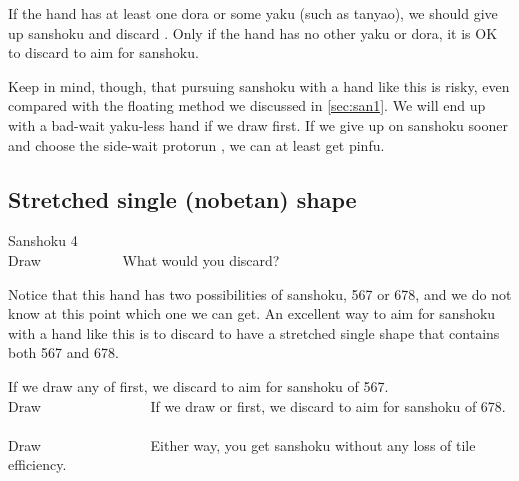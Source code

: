 \bigskip
If the hand has at least one {\jap dora} or some {\jap yaku} (such as {\jap tanyao}), we should give up {\jap sanshoku} and discard {\LARGE{}}. Only if the hand has no other {\jap yaku} or {\jap dora}, it is OK to discard {\LARGE{}} to aim for {\jap sanshoku}.

\bigskip
Keep in mind, though, that pursuing {\jap sanshoku} with a hand like this is risky, even compared with the floating method we discussed in \ref{sec:san1}. We will end up with a bad-wait {\jap yaku}-less hand if we draw {\LARGE{}} first. If we give up on {\jap sanshoku} sooner and choose the side-wait protorun {\LARGE{}}, we can at least get {\jap pinfu}.

\newpage
\subsection{Stretched single ({\jap nobetan}) shape}\label{sec:san4}
\begin{itembox}[r]{{\jap Sanshoku} 4}
\bp
{}~\\
\hfill\footnotesize{Draw~~~~~~~~~~~}
\ep
\vspace{-17pt}What would you discard? \vspace{-5pt}
\end{itembox}
\noindent
Notice that this hand has two possibilities of {\jap sanshoku}, 567 or 678, and we do not know at this point which one we can get. An excellent way to aim for {\jap sanshoku} with a hand like this is to discard {\LARGE{}} to have a stretched single shape {\LARGE{}} that contains both 567 and 678.

\bigskip
\noindent If we draw any of {\LARGE{}} first, we discard {\LARGE{}} to aim for {\jap sanshoku} of 567.
\bp
{}~\\
\hfill\footnotesize{Draw~~~~~~~~~~~~~~~}
\ep
If we draw {\LARGE{}} or {\LARGE{}} first, we discard {\LARGE{}} to aim for {\jap sanshoku} of 678.
\bp
{}~\\
\hfill\footnotesize{Draw~~~~~~~~~~~~~~~}
\ep
Either way, you get {\jap sanshoku} without any loss of tile efficiency.


